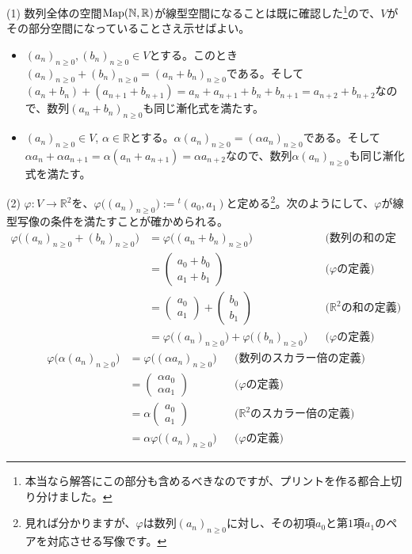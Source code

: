 \noindent (1) 数列全体の空間$\operatorname{Map}(\mathbb{N}, \mathbb{R})$が線型空間になることは既に確認した\footnote{本当なら解答にこの部分も含めるべきなのですが、プリントを作る都合上切り分けました。}ので、$V$がその部分空間になっていることさえ示せばよい。
\begin{itemize}
\item $(a_n)_{n\geq 0}, (b_n)_{n\geq 0}\in V$とする。このとき$(a_n)_{n\geq 0} + (b_n)_{n\geq 0} = (a_n + b_n)_{n\geq 0}$である。そして$(a_n + b_n) + (a_{n+1} + b_{n+1}) = a_n + a_{n+1} + b_n + b_{n+1} = a_{n+2} + b_{n+2}$なので、数列$(a_n + b_n)_{n\geq 0}$も同じ漸化式を満たす。
\item $(a_n)_{n\geq 0}\in V$, $\alpha\in\mathbb{R}$とする。$\alpha (a_n)_{n\geq 0} = (\alpha a_n)_{n\geq 0}$である。そして$\alpha a_n + \alpha a_{n+1} = \alpha (a_n + a_{n+1}) = \alpha a_{n+2}$なので、数列$\alpha (a_n)_{n\geq 0}$も同じ漸化式を満たす。
\end{itemize}

\noindent (2) $\varphi\colon V\rightarrow \mathbb{R}^2$を、$\varphi\bigl((a_n)_{n \geq 0}\bigr) := {}^t(a_0, a_1)$と定める\footnote{見れば分かりますが、$\varphi$は数列$(a_n)_{n \geq 0}$に対し、その初項$a_0$と第$1$項$a_1$のペアを対応させる写像です。}。次のようにして、$\varphi$が線型写像の条件を満たすことが確かめられる。
\begin{align*}
\varphi\bigl((a_n)_{n\geq 0} + (b_n)_{n\geq 0}\bigr) &= \varphi\bigl((a_n + b_n)_{n\geq 0}\bigr) & & \text{(数列の和の定義)} \\
&= 
\begin{pmatrix}
a_0 + b_0 \\
a_1 + b_1
\end{pmatrix}
& & \text{($\varphi$の定義)} \\
&= 
\begin{pmatrix}
a_0 \\
a_1
\end{pmatrix}
+
\begin{pmatrix}
b_0 \\
b_1
\end{pmatrix}
& & \text{($\mathbb{R}^2$の和の定義)} \\
&= \varphi\bigl((a_n)_{n\geq 0}\bigr) + \varphi\bigl((b_n)_{n\geq 0}\bigr) & & \text{($\varphi$の定義)}
\end{align*}
\begin{align*}
\varphi\bigl(\alpha(a_n)_{n\geq 0}\bigr) &= \varphi\bigl((\alpha a_n)_{n\geq 0}\bigr) & & \text{(数列のスカラー倍の定義)} \\
&= 
\begin{pmatrix}
\alpha a_0 \\
\alpha a_1
\end{pmatrix}
& & \text{($\varphi$の定義)} \\
&= 
\alpha
\begin{pmatrix}
a_0 \\
a_1
\end{pmatrix}
& & \text{($\mathbb{R}^2$のスカラー倍の定義)} \\
&= \alpha \varphi\bigl((a_n)_{n\geq 0}\bigr) & & \text{($\varphi$の定義)}
\end{align*}

